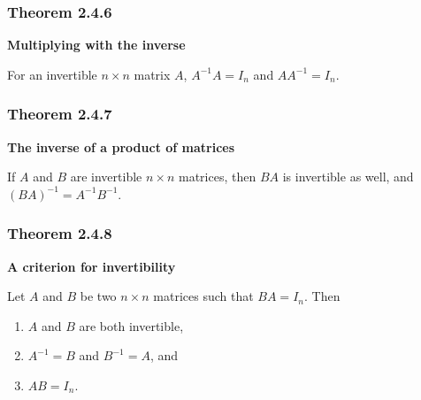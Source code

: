 \documentclass{report}
\begin{document}
\subsubsection*{Theorem 2.4.6}
\par\noindent\textbf{Multiplying with the inverse}
\par\noindent For an invertible $n\times{}n$ matrix $A$, $A^{-1}A=I_{n}$ and $AA^{-1}=I_{n}$.
\subsubsection*{Theorem 2.4.7}
\par\noindent\textbf{The inverse of a product of matrices}
\par\noindent If $A$ and $B$ are invertible $n\times{}n$ matrices, then $BA$ is invertible as well, and $(BA)^{-1}=A^{-1}B^{-1}$.
\subsubsection*{Theorem 2.4.8}
\par\noindent\textbf{A criterion for invertibility}
\par\noindent Let $A$ and $B$ be two $n\times{}n$ matrices such that $BA=I_{n}$. Then
\renewcommand{\labelenumi}{\textbf{\alph{enumi}.}}
\begin{enumerate}
\item $A$ and $B$ are both invertible,
\item $A^{-1}=B$ and $B^{-1}=A$, and
\item $AB=I_{n}$.
\end{enumerate}
\end{document}
